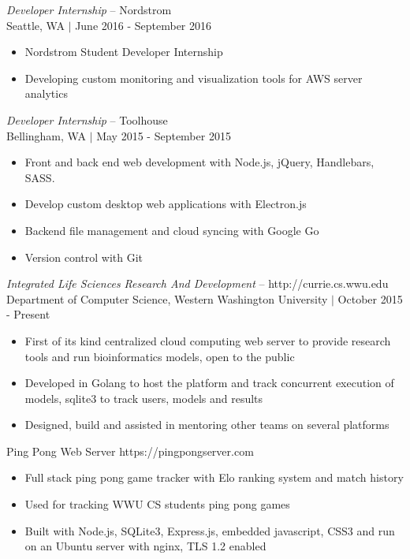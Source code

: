 \documentclass[line,margin]{res}
\begin{document}
\begin{resume}
	{\sl Developer Internship} -- {\footnotesize Nordstrom} \\
	{\footnotesize Seattle, WA $|$  June 2016 - September 2016}
	\begin{itemize} \itemsep -2pt
		\item Nordstrom Student Developer Internship
		\item Developing custom monitoring and visualization tools for AWS server analytics
	\end{itemize}
	{\sl Developer Internship} -- {\footnotesize Toolhouse} \\
	{\footnotesize Bellingham, WA $|$  May 2015 - September 2015}
	\begin{itemize} \itemsep -2pt
		\item Front and back end web development with Node.js, jQuery, Handlebars, SASS.
		\item Develop custom desktop web applications with Electron.js
		\item Backend file management and cloud syncing with Google Go
		\item Version control with Git
	\end{itemize}
	{\sl Integrated Life Sciences Research And Development} -- {\footnotesize http://currie.cs.wwu.edu} \\
	{\footnotesize Department of Computer Science, Western Washington University $|$ October 2015 - Present}
	\begin{itemize}\itemsep -2pt
		\item First of its kind centralized cloud computing web server to provide research tools and run bioinformatics models, open to the public
		\item Developed in Golang to host the platform and track concurrent execution of models, sqlite3 to track users, models and results
		\item Designed, build and assisted in mentoring other teams on several platforms
	\end{itemize}
	Ping Pong Web Server {\footnotesize https://pingpongserver.com}
	\begin{itemize}\itemsep -2pt
		\item Full stack ping pong game tracker with Elo ranking system and match history
		\item Used for tracking WWU CS students ping pong games
		\item Built with Node.js, SQLite3, Express.js, embedded javascript, CSS3 and run on an Ubuntu server with nginx, TLS 1.2 enabled
	\end{itemize}


\end{resume}
\end{document}
